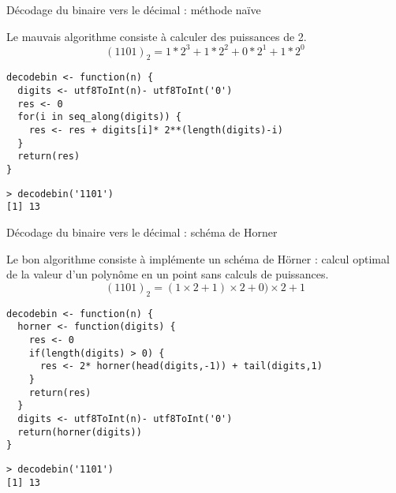 \documentclass[10pt]{beamer}
\begin{document}
\begin{frame}[fragile]{Décodage du binaire vers le décimal : méthode naïve}

  Le \alert{mauvais algorithme} consiste à calculer des puissances de 2.
  $$(1101)_2 = 1*2^3 + 1*2^2 + 0*2^1 + 1*2^0$$
  \begin{lstlisting}[style=editor]
decodebin <- function(n) {
  digits <- utf8ToInt(n)- utf8ToInt('0')
  res <- 0
  for(i in seq_along(digits)) {
    res <- res + digits[i]* 2**(length(digits)-i)
  }
  return(res)
}    
\end{lstlisting}

\begin{lstlisting}
> decodebin('1101')
[1] 13  
\end{lstlisting}
\end{frame}

\begin{frame}[fragile]{Décodage du binaire vers le décimal : schéma de Horner}

  Le \alert{bon algorithme} consiste à implémente un schéma de Hörner : calcul optimal de
  la valeur d’un polynôme en un point sans calculs de puissances.
  $$(1101)_2 = (1 \times 2 + 1) \times 2 + 0) \times 2 + 1$$
  \begin{lstlisting}[style=editor]
decodebin <- function(n) {
  horner <- function(digits) {
    res <- 0
    if(length(digits) > 0) {
      res <- 2* horner(head(digits,-1)) + tail(digits,1)
    }
    return(res)
  }
  digits <- utf8ToInt(n)- utf8ToInt('0')
  return(horner(digits))
}
\end{lstlisting}

\begin{lstlisting}
> decodebin('1101')
[1] 13  
\end{lstlisting}
\end{frame}
\end{document}
